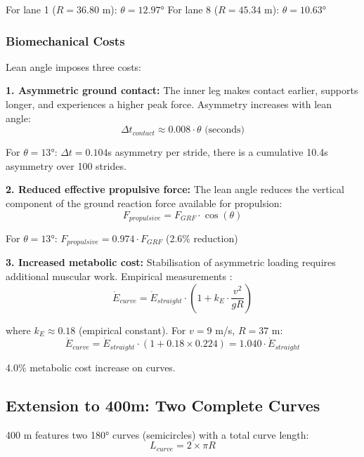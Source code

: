 For lane 1 ($R = 36.80$ m): $\theta = 12.97°$
For lane 8 ($R = 45.34$ m): $\theta = 10.63°$

\subsubsection{Biomechanical Costs}

Lean angle imposes three costs:

\textbf{1. Asymmetric ground contact:}
The inner leg makes contact earlier, supports longer, and experiences a higher peak force. Asymmetry increases with lean angle:
\begin{equation}
\Delta t_{contact} \approx 0.008 \cdot \theta \text{ (seconds)}
\end{equation}

For $\theta = 13°$: $\Delta t = 0.104$s asymmetry per stride, there is a cumulative 10.4s asymmetry over 100 strides.

\textbf{2. Reduced effective propulsive force:}
The lean angle reduces the vertical component of the ground reaction force available for propulsion:
\begin{equation}
F_{propulsive} = F_{GRF} \cdot \cos(\theta)
\end{equation}

For $\theta = 13°$: $F_{propulsive} = 0.974 \cdot F_{GRF}$ (2.6\% reduction)

\textbf{3. Increased metabolic cost:}
Stabilisation of asymmetric loading requires additional muscular work. Empirical measurements \citep{Churchill2015}:
\begin{equation}
\dot{E}_{curve} = \dot{E}_{straight} \cdot \left(1 + k_E \cdot \frac{v^2}{gR}\right)
\end{equation}

where $k_E \approx 0.18$ (empirical constant). For $v = 9$ m/s, $R = 37$ m:
\begin{equation}
\dot{E}_{curve} = \dot{E}_{straight} \cdot (1 + 0.18 \times 0.224) = 1.040 \cdot \dot{E}_{straight}
\end{equation}

4.0\% metabolic cost increase on curves.

\subsection{Extension to 400m: Two Complete Curves}

400 m features two 180° curves (semicircles) with a total curve length:
\begin{equation}
L_{curve} = 2 \times \pi R
\end{equation}

